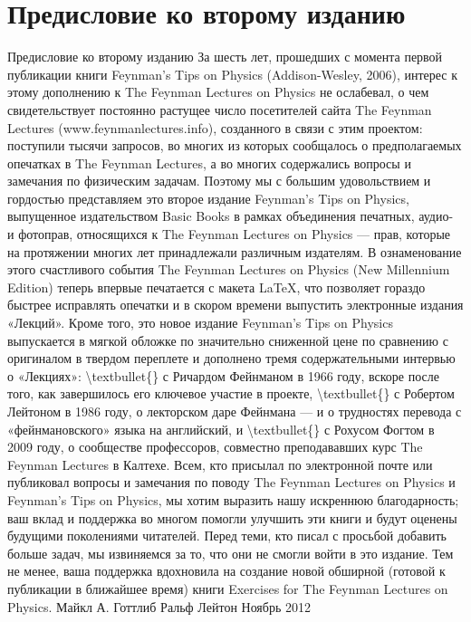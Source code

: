 \documentclass[10pt,oneside]{article}
\begin{document}
\section*{Предисловие ко второму изданию}
\label{tips-sec-1-предисловие-ко-второму-изданию}
Предисловие ко второму изданию За шесть лет, прошедших с момента первой публикации книги Feynman’s Tips on Physics (Addison-Wesley, 2006), интерес к этому дополнению к The Feynman Lectures on Physics не ослабевал, о чем свидетельствует постоянно растущее число посетителей сайта The Feynman Lectures (www.feynmanlectures.info), созданного в связи с этим проектом: поступили тысячи запросов, во многих из которых сообщалось о предполагаемых опечатках в The Feynman Lectures, а во многих содержались вопросы и замечания по физическим задачам. Поэтому мы с большим удовольствием и гордостью представляем это второе издание Feynman’s Tips on Physics, выпущенное издательством Basic Books в рамках объединения печатных, аудио- и фотоправ, относящихся к The Feynman Lectures on Physics --- прав, которые на протяжении многих лет принадлежали различным издателям. В ознаменование этого счастливого события The Feynman Lectures on Physics (New Millennium Edition) теперь впервые печатается с макета LaTeX, что позволяет гораздо быстрее исправлять опечатки и в скором времени выпустить электронные издания «Лекций». Кроме того, это новое издание Feynman’s Tips on Physics выпускается в мягкой обложке по значительно сниженной цене по сравнению с оригиналом в твердом переплете и дополнено тремя содержательными интервью о «Лекциях»: \textbackslash{}textbullet\{\} с Ричардом Фейнманом в 1966 году, вскоре после того, как завершилось его ключевое участие в проекте, \textbackslash{}textbullet\{\} с Робертом Лейтоном в 1986 году, о лекторском даре Фейнмана --- и о трудностях перевода с «фейнмановского» языка на английский, и \textbackslash{}textbullet\{\} с Рохусом Фогтом в 2009 году, о сообществе профессоров, совместно преподававших курс The Feynman Lectures в Калтехе. Всем, кто присылал по электронной почте или публиковал вопросы и замечания по поводу The Feynman Lectures on Physics и Feynman’s Tips on Physics, мы хотим выразить нашу искреннюю благодарность; ваш вклад и поддержка во многом помогли улучшить эти книги и будут оценены будущими поколениями читателей. Перед теми, кто писал с просьбой добавить больше задач, мы извиняемся за то, что они не смогли войти в это издание. Тем не менее, ваша поддержка вдохновила на создание новой обширной (готовой к публикации в ближайшее время) книги Exercises for The Feynman Lectures on Physics. Майкл А. Готтлиб Ральф Лейтон Ноябрь 2012\par
\end{document}
